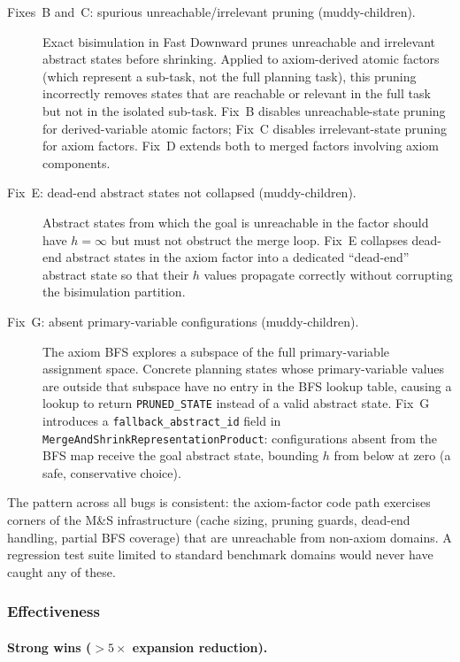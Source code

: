 \documentclass[11pt,a4paper]{article}
\begin{document}
\begin{description}
\item[Fixes~B and~C: spurious unreachable/irrelevant pruning (muddy-children).]
Exact bisimulation in Fast Downward prunes unreachable and irrelevant abstract
states before shrinking.  Applied to axiom-derived atomic factors (which
represent a sub-task, not the full planning task), this pruning incorrectly
removes states that are reachable or relevant in the full task but not in the
isolated sub-task.  Fix~B disables unreachable-state pruning for derived-variable
atomic factors; Fix~C disables irrelevant-state pruning for axiom factors.
Fix~D extends both to merged factors involving axiom components.

\item[Fix~E: dead-end abstract states not collapsed (muddy-children).]
Abstract states from which the goal is unreachable in the factor should have
$h=\infty$ but must not obstruct the merge loop.  Fix~E collapses dead-end
abstract states in the axiom factor into a dedicated ``dead-end'' abstract state
so that their $h$ values propagate correctly without corrupting the bisimulation
partition.

\item[Fix~G: absent primary-variable configurations (muddy-children).]
The axiom BFS explores a subspace of the full primary-variable assignment space.
Concrete planning states whose primary-variable values are outside that subspace
have no entry in the BFS lookup table, causing a lookup to return
\texttt{PRUNED\_STATE} instead of a valid abstract state.  Fix~G introduces a
\texttt{fallback\_abstract\_id} field in
\texttt{MergeAndShrinkRepresentationProduct}: configurations absent from the
BFS map receive the goal abstract state, bounding $h$ from below at zero (a
safe, conservative choice).
\end{description}

The pattern across all bugs is consistent: the axiom-factor code path exercises
corners of the M\&S infrastructure (cache sizing, pruning guards, dead-end
handling, partial BFS coverage) that are unreachable from non-axiom domains.
A regression test suite limited to standard benchmark domains would never have
caught any of these.

\subsubsection{Effectiveness}

\paragraph{Strong wins ($>5\times$ expansion reduction).}
\end{document}
